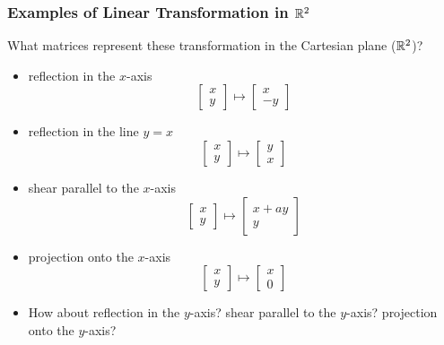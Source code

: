 \documentclass{beamer}
\begin{document}
\begin{frame}
  \frametitle{Examples of Linear Transformation in $\mathbb{R}^2$}

{\small What matrices represent these transformation in the Cartesian plane ($\mathbb{R}^2$)?}


\begin{itemize}
\item reflection in the $x$-axis
\[
\left[
\begin{array}{c}
x \\ y 
\end{array}
\right]
\mapsto
\left[
\begin{array}{c}
x \\ -y 
\end{array}
\right]
\]

\item reflection in the line $y = x$
\[
\left[
\begin{array}{c}
x \\ y 
\end{array}
\right]
\mapsto
\left[
\begin{array}{c}
y \\ x 
\end{array}
\right]
\]

\item shear parallel to the $x$-axis
\[
\left[
\begin{array}{c}
x \\ y 
\end{array}
\right]
\mapsto
\left[
\begin{array}{c}
x+ay \\ y 
\end{array}
\right]
\]

\item projection onto the $x$-axis
\[
\left[
\begin{array}{c}
x \\ y 
\end{array}
\right]
\mapsto
\left[
\begin{array}{c}
x \\ 0 
\end{array}
\right]
\]


\item How about reflection in the $y$-axis? shear parallel to the $y$-axis? projection onto the $y$-axis?

\end{itemize}

\end{frame}
\end{document}
